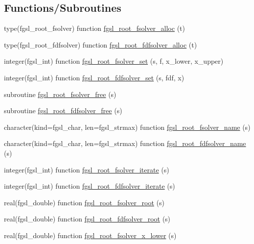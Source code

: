 \subsection*{Functions/\+Subroutines}
\begin{DoxyCompactItemize}
\item 
type(fgsl\+\_\+root\+\_\+fsolver) function \hyperlink{roots_8finc_a9e423996b996cace4445b0b7c8d49c47}{fgsl\+\_\+root\+\_\+fsolver\+\_\+alloc} (t)
\item 
type(fgsl\+\_\+root\+\_\+fdfsolver) function \hyperlink{roots_8finc_a754a00901764d3a2702b28492377d31f}{fgsl\+\_\+root\+\_\+fdfsolver\+\_\+alloc} (t)
\item 
integer(fgsl\+\_\+int) function \hyperlink{roots_8finc_a4eaeff2b5c48b40a60627201b0ed2a1c}{fgsl\+\_\+root\+\_\+fsolver\+\_\+set} (s, f, x\+\_\+lower, x\+\_\+upper)
\item 
integer(fgsl\+\_\+int) function \hyperlink{roots_8finc_ad5cfd8eab01316799d223177c8902c2f}{fgsl\+\_\+root\+\_\+fdfsolver\+\_\+set} (s, fdf, x)
\item 
subroutine \hyperlink{roots_8finc_ab651ed93d541399c16b925c81eda546d}{fgsl\+\_\+root\+\_\+fsolver\+\_\+free} (s)
\item 
subroutine \hyperlink{roots_8finc_a35459afca718dd3a99651e5e993f46a3}{fgsl\+\_\+root\+\_\+fdfsolver\+\_\+free} (s)
\item 
character(kind=fgsl\+\_\+char, len=fgsl\+\_\+strmax) function \hyperlink{roots_8finc_a8f1354b9512e43ae0af0752cb4a29f0b}{fgsl\+\_\+root\+\_\+fsolver\+\_\+name} (s)
\item 
character(kind=fgsl\+\_\+char, len=fgsl\+\_\+strmax) function \hyperlink{roots_8finc_a949c461b3543e81b68a43e4fd100e88b}{fgsl\+\_\+root\+\_\+fdfsolver\+\_\+name} (s)
\item 
integer(fgsl\+\_\+int) function \hyperlink{roots_8finc_a16e821dd161b28bc9cd5ff5e68358915}{fgsl\+\_\+root\+\_\+fsolver\+\_\+iterate} (s)
\item 
integer(fgsl\+\_\+int) function \hyperlink{roots_8finc_aabdb1cc46e7b7bd1bdf6d70756c1f414}{fgsl\+\_\+root\+\_\+fdfsolver\+\_\+iterate} (s)
\item 
real(fgsl\+\_\+double) function \hyperlink{roots_8finc_abd614e562da9a1d0f498ad9705a5bf17}{fgsl\+\_\+root\+\_\+fsolver\+\_\+root} (s)
\item 
real(fgsl\+\_\+double) function \hyperlink{roots_8finc_aa56f439a45653c3ad87c4dab8bce52cc}{fgsl\+\_\+root\+\_\+fdfsolver\+\_\+root} (s)
\item 
real(fgsl\+\_\+double) function \hyperlink{roots_8finc_a50e5822efb5024274b19e437e33776b2}{fgsl\+\_\+root\+\_\+fsolver\+\_\+x\+\_\+lower} (s)

\end{DoxyCompactItemize}
